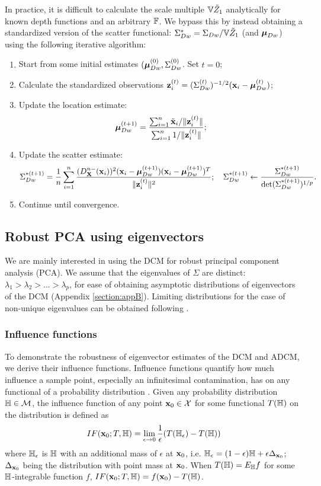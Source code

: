 In practice, it is difficult to calculate the scale multiple ${\mathbb{V}} \tilde Z_1$ analytically for known depth functions and an arbitrary ${\mathbb{F}}$. We bypass this by instead obtaining a standardized version of the scatter functional: $\Sigma_{Dw}^* = \Sigma_{Dw} / {\mathbb{V}} \tilde Z_1$ (and ${\boldsymbol{\mu}}_{Dw}$) using the following iterative algorithm:

\begin{enumerate}
\item Start from some initial estimates $({\boldsymbol{\mu}}_{Dw}^{(0)}, \Sigma_{Dw}^{(0)}$. Set $t=0$;

\item Calculate the standardized observations ${\bf{z}}_i^{(t)} = (\Sigma_{Dw}^{(t)})^{-1/2} ({\bf{x}}_i - {\boldsymbol{\mu}}_{Dw}^{(t)})$;

\item Update the location estimate:
%
$$
{\boldsymbol{\mu}}_{Dw}^{(t+1)} = \frac{\sum_{i=1}^n \tilde {{\bf{x}}}_i / \| {\bf{z}}_i^{(t)} \| }{\sum_{i=1}^n 1 / \| {\bf{z}}_i^{(t)} \|};
$$
%
\item Update the scatter estimate:
%
$$
\Sigma_{Dw}^{*(t+1)} = \frac{1}{n} \sum_{i=1}^n \frac{(D^{n-}_{\mathbf{X}} ({\bf{x}}_i))^2 ({\bf{x}}_i - {\boldsymbol{\mu}}_{Dw}^{(t+1)})({\bf{x}}_i - {\boldsymbol{\mu}}_{Dw}^{(t+1)})^T}{\| {\bf{z}}_i^{(t)} \|^2}; \quad \Sigma_{Dw}^{*(t+1)} \leftarrow \frac{\Sigma_{Dw}^{*(t+1)}}{\text{det} (\Sigma_{Dw}^{*(t+1)})^{1/p}}.
$$
%
\item Continue until convergence.
\end{enumerate}

\subsection{Robust PCA using eigenvectors}

We are mainly interested in using the DCM for robust principal component analysis (PCA). We assume that the eigenvalues of $\Sigma$ are distinct: $\lambda_1 > \lambda_2 > ... > \lambda_p$, for ease of obtaining asymptotic distributions of eigenvectors of the DCM (Appendix \ref{section:appB}). Limiting distributions for the case of non-unique eigenvalues can be obtained following \cite{magyar14}.

\subsubsection{Influence functions}
To demonstrate the robustness of eigenvector estimates of the DCM and ADCM, we derive their influence functions. Influence functions quantify how much influence a sample point, especially an infinitesimal contamination, has on any functional of a probability distribution \citep{HampelBook86}. Given any probability distribution ${\mathbb{H}} \in \mathcal{M}$, the influence function of any point ${\bf{x}}_0 \in \mathcal{X}$ for some functional $T({\mathbb{H}})$ on the distribution is defined as
%
$$
IF({\bf{x}}_0; T,{\mathbb{H}}) =
\lim_{\epsilon \rightarrow 0} \frac{1}{\epsilon} (T({\mathbb{H}}_\epsilon) - T({\mathbb{H}}))
$$
%
where ${\mathbb{H}}_\epsilon$ is ${\mathbb{H}}$ with an additional mass of $\epsilon$ at ${\bf{x}}_0$, i.e. ${\mathbb{H}}_\epsilon = (1-\epsilon){\mathbb{H}} + \epsilon \Delta_{{\bf{x}}_0}$; $\Delta_{{\bf{x}}_0}$ being the distribution with point mass at ${\bf{x}}_0$. When $T({\mathbb{H}}) = E_{\mathbb{H}} f$ for some ${\mathbb{H}}$-integrable function $f$, $IF({\bf{x}}_0; T,{\mathbb{H}}) = f({\bf{x}}_0) - T({\mathbb{H}})$.


